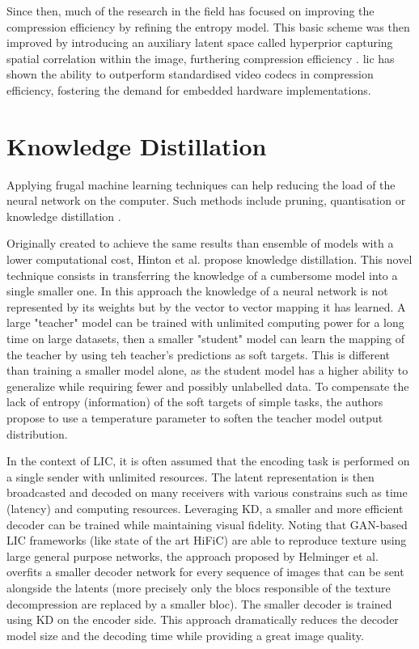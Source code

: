 Since then, much of the research in the field has focused on improving the compression efficiency by refining the entropy model. This basic scheme was then improved by introducing an auxiliary latent space called hyperprior capturing spatial correlation within the image, furthering compression efficiency \cite{ballé2018variationalimagecompressionscale}. \acrshort{lic} has shown the ability to outperform standardised video codecs in compression efficiency, fostering the demand for embedded hardware implementations.

\section{Knowledge Distillation}
Applying frugal machine learning techniques can help reducing the load of the neural network on the computer. Such methods include pruning, quantisation or knowledge distillation \cite{touvron2021trainingdataefficientimagetransformers}. %

Originally created to achieve the same results than ensemble of models with a lower computational cost, Hinton et al. \cite{hinton2015distillingknowledgeneuralnetwork} propose knowledge distillation. This novel technique consists in transferring the knowledge of a cumbersome model into a single smaller one. In this approach the knowledge of a neural network is not represented by its weights but by the vector to vector mapping it has learned. A large "teacher" model can be trained with unlimited computing power for a long time on large datasets, then a smaller "student" model can learn the mapping of the teacher by using teh teacher's predictions as soft targets. This is different than training a smaller model alone, as the student model has a higher ability to generalize while requiring fewer and possibly unlabelled data. To compensate the lack of entropy (information) of the soft targets of simple tasks, the authors propose to use a temperature parameter to soften the teacher model output distribution.

In the context of LIC, it is often assumed that the encoding task is performed on a single sender with unlimited resources. The latent representation is then broadcasted and decoded on many receivers with various constrains such as time (latency) and computing resources. Leveraging KD, a smaller and more efficient decoder can be trained while maintaining visual fidelity. Noting that GAN-based LIC frameworks (like state of the art HiFiC) are able to reproduce texture using large general purpose networks, the approach proposed by Helminger et al. \cite{helminger2022microdosingknowledgedistillationgan} overfits a smaller decoder network for every sequence of images that can be sent alongside the latents (more precisely only the blocs responsible of the texture decompression are replaced by a smaller bloc). The smaller decoder is trained using KD on the encoder side. This approach dramatically reduces the decoder model size and the decoding time while providing a great image quality.

